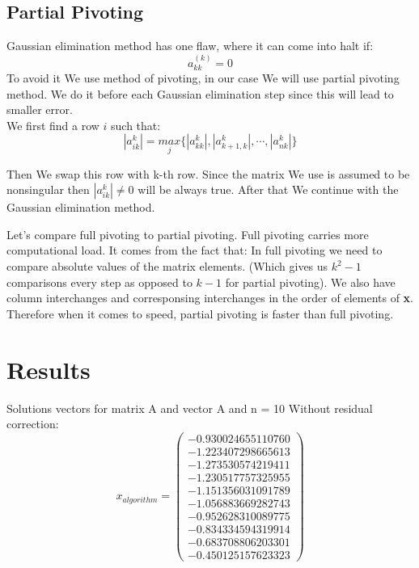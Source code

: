 \documentclass[12pt]{report}
\begin{document}
\subsection{Partial Pivoting}
Gaussian elimination method has one flaw, where it can come into halt if:
\[ a_{kk}^{(k)} = 0 \]
To avoid it We use method of pivoting, in our case We will use partial pivoting method.
We do it before each Gaussian elimination step since this will lead to smaller error.
\\We first find a row $i$ such that:
\[ |{a_{ik}^{k}}| = \underset{j}{max} \{ |{a_{kk}^{k}}|, |{a_{k+1, k}^{k}}|, \cdots, |{a_{nk}^{k}}|\} \]

Then We swap this row with k-th row. Since the matrix We use is assumed to be nonsingular then $|{a_{ik}^{k}}| \neq 0$ will be always true. After that We continue with the Gaussian elimination method.

Let's compare full pivoting to partial pivoting.
Full pivoting carries more computational load. It comes from the fact that:
In full pivoting we need to compare absolute values of the matrix elements. (Which gives us $ k^2-1$ comparisons every step as opposed to $k-1$ for partial pivoting). We also have column interchanges and corresponsing interchanges in the order of elements of \textbf{x}.
Therefore when it comes to speed, partial pivoting is faster than full pivoting.

\section{Results}
Solutions vectors for matrix A and vector A and n = 10
Without residual correction:
\[ x_{algorithm} = \left(\begin{array}{cc}
-0.930024655110760 \\
-1.223407298665613 \\
-1.273530574219411 \\
-1.230517757325955 \\
-1.151356031091789 \\
-1.056883669282743 \\
-0.952628310089775 \\
-0.834334594319914 \\
-0.683708806203301 \\
-0.450125157623323
\end{array} \right)
\]
\end{document}
